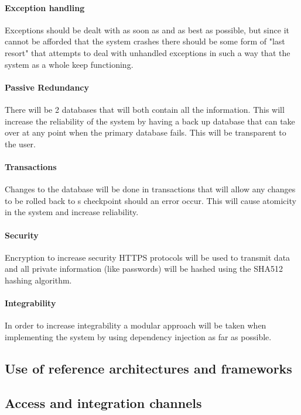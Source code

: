 \documentclass[english]{article}
\begin{document}
			\paragraph{Exception handling}\indent
			Exceptions should be dealt with as soon as and as best as possible, but since it cannot be afforded that the system crashes there should be some form of "last resort" that attempts to deal with unhandled exceptions in such a way that the system as a whole keep functioning.
			
			\paragraph{Passive Redundancy}\indent
			There will be 2 databases that will both contain all the information. This will increase the reliability of the system by having a back up database that can take over at any point when the primary database fails. This will be transparent to the user.
			
			\paragraph{Transactions}\indent
			Changes to the database will be done in transactions that will allow any changes to be rolled back to s checkpoint should an error occur. This will cause atomicity in the system and increase reliability.
			
			\paragraph{Security}\indent
			Encryption to increase security HTTPS protocols will be used to transmit data and all private information (like passwords) will be hashed using the SHA512 hashing algorithm.
			
			\paragraph{Integrability}\indent
			In order to increase integrability a modular approach will be taken when implementing the system by using dependency injection as far as possible.
			
		\subsection{Use of reference architectures and frameworks}
		
		\subsection{Access and integration channels}
		
\end{document}
